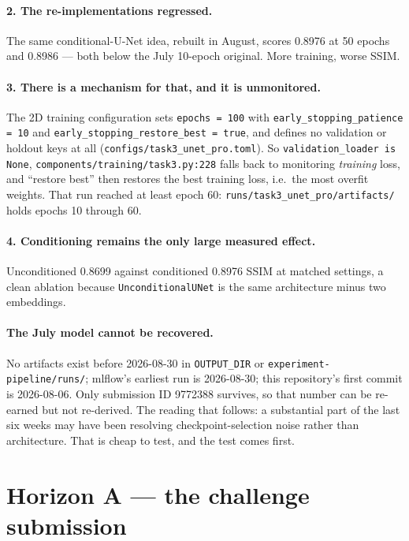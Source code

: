 \documentclass[11pt,a4paper]{article}
\begin{document}
\paragraph{2. The re-implementations regressed.} The same conditional-U-Net idea, rebuilt in August,
scores \num{0.8976} at 50 epochs and \num{0.8986} --- both below the July 10-epoch original. More
training, worse SSIM.

\paragraph{3. There is a mechanism for that, and it is unmonitored.}
The 2D training configuration sets \texttt{epochs = 100} with
\texttt{early\_stopping\_patience = 10} and \texttt{early\_stopping\_restore\_best = true}, and defines no
validation or holdout keys at all (\texttt{configs/task3\_unet\_pro.toml}). So \texttt{validation\_loader is None},
\texttt{components/training/task3.py:228} falls back to monitoring \emph{training} loss, and
``restore best'' then restores the best training loss, i.e.\ the most overfit weights. That run reached
at least epoch 60: \texttt{runs/task3\_unet\_pro/artifacts/} holds epochs 10 through 60.

\paragraph{4. Conditioning remains the only large measured effect.} Unconditioned \num{0.8699} against
conditioned \num{0.8976} SSIM at matched settings, a clean ablation because
\texttt{UnconditionalUNet} is the same architecture minus two embeddings.

\paragraph{The July model cannot be recovered.} No artifacts exist before 2026-08-30 in
\texttt{OUTPUT\_DIR} or \texttt{experiment-pipeline/runs/}; mlflow's earliest run is 2026-08-30; this
repository's first commit is 2026-08-06. Only submission ID \num{9772388} survives, so that number can
be re-earned but not re-derived. The reading that follows: a substantial part of the last six weeks may
have been resolving checkpoint-selection noise rather than architecture. That is cheap to test, and the
test comes first.

\section{Horizon A --- the challenge submission}
\label{sec:horizonA}
\end{document}
